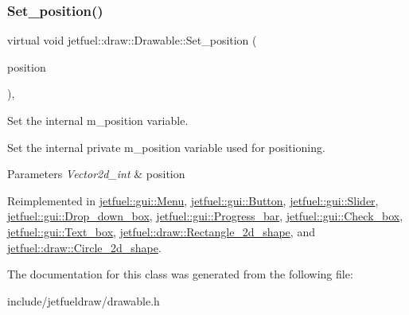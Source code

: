 \subsubsection{\texorpdfstring{Set\+\_\+position()}{Set\_position()}}
{\footnotesize\ttfamily virtual void jetfuel\+::draw\+::\+Drawable\+::\+Set\+\_\+position (\begin{DoxyParamCaption}\item[{const \hyperlink{classjetfuel_1_1draw_1_1Vector2d}{Vector2d\+\_\+int}}]{position }\end{DoxyParamCaption})\hspace{0.3cm}{\ttfamily [inline]}, {\ttfamily [virtual]}}



Set the internal m\+\_\+position variable. 

Set the internal private m\+\_\+position variable used for positioning.


\begin{DoxyParams}{Parameters}
{\em Vector2d\+\_\+int} & position \\
\hline
\end{DoxyParams}


Reimplemented in \hyperlink{classjetfuel_1_1gui_1_1Menu_ab575d5e4ad9d86d6781012e7d1bebc9a}{jetfuel\+::gui\+::\+Menu}, \hyperlink{classjetfuel_1_1gui_1_1Button_a642d3f1412339c826458b80dce76ef34}{jetfuel\+::gui\+::\+Button}, \hyperlink{classjetfuel_1_1gui_1_1Slider_a11721a72699e9d1cdd0f6e5709f003e4}{jetfuel\+::gui\+::\+Slider}, \hyperlink{classjetfuel_1_1gui_1_1Drop__down__box_acba86706261397994c96727a0184a78c}{jetfuel\+::gui\+::\+Drop\+\_\+down\+\_\+box}, \hyperlink{classjetfuel_1_1gui_1_1Progress__bar_a5f52369cccd805274805abf5913535df}{jetfuel\+::gui\+::\+Progress\+\_\+bar}, \hyperlink{classjetfuel_1_1gui_1_1Check__box_aca11db17630485a2c44b19780d10cce6}{jetfuel\+::gui\+::\+Check\+\_\+box}, \hyperlink{classjetfuel_1_1gui_1_1Text__box_a86476b518f2aa3ea4d00ac67f2b03703}{jetfuel\+::gui\+::\+Text\+\_\+box}, \hyperlink{classjetfuel_1_1draw_1_1Rectangle__2d__shape_a375b0892589ef7cd1762576e9ce96875}{jetfuel\+::draw\+::\+Rectangle\+\_\+2d\+\_\+shape}, and \hyperlink{classjetfuel_1_1draw_1_1Circle__2d__shape_a551b38063543823483f560bf3eebcd2c}{jetfuel\+::draw\+::\+Circle\+\_\+2d\+\_\+shape}.



The documentation for this class was generated from the following file\+:\begin{DoxyCompactItemize}
\item 
include/jetfueldraw/drawable.\+h\end{DoxyCompactItemize}
